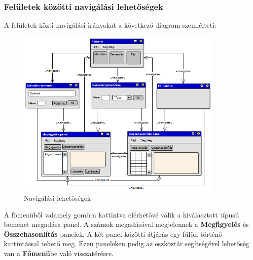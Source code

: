 \documentclass{elteikthesis}
\begin{document}
\subsubsection{Felületek közötti navigálási lehetőségek}
A felületek közti navigálási irányokat a következő diagram szemlélteti:
\begin{figure}[H]
	\centering
	\includegraphics[width=0.9\textwidth]{pics/plan_directions.png}
	\caption{Navigálási lehetőségek}
\end{figure}
A főmenüből valamely gombra kattintva elérhetővé válik a kiválasztott típusú bemenet megadása panel. A számok megadásával megjelennek a \textbf{Megfigyelés} és \textbf{Összehasonlítás} panelek. A két panel közötti átjárás egy fülön történő kattintással tehető meg. Ezen paneleken pedig az eszköztár segítségével lehetőség van a \textbf{Főmenü}be való visszatérésre.
\end{document}
